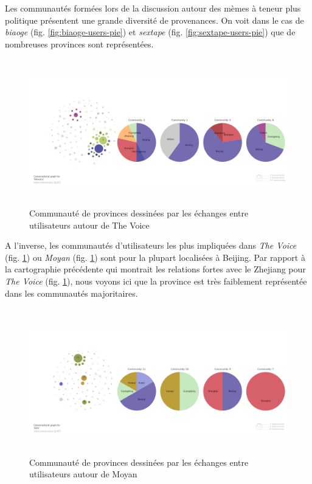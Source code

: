 Les communaut\'es form\'ees lors de la discussion autour des m\`emes \`a
teneur plus politique pr\'esentent une grande diversit\'e de
provenances. On voit dans le cas de \textit{biaoge} (fig. \ref{fig:biaoge-users-pie}) et \textit{sextape} (fig. \ref{fig:sextape-users-pie}) que de nombreuses provinces sont repr\'esent\'ees. 


\begin{figure}[H]
    \centering
    \includegraphics[width=5.9996in,height=2.5004in]{figures/chap4/chapitre4-img56.png}
    \caption{
        Communaut\'e de provinces dessin\'ees par les \'echanges entre utilisateurs autour de The Voice
    }
    \label{fig:voice-users-pie}
\end{figure}




A l{\textquoteright}inverse, les communaut\'es
d{\textquoteright}utilisateurs les plus impliqu\'ees dans \textit{The
Voice } (fig. \ref{fig:voice-users-pie}) ou \textit{Moyan} (fig. \ref{fig:voice-users-pie}) sont pour la plupart localis\'ees \`a Beijing.
Par rapport \`a la cartographie pr\'ec\'edente qui montrait les
relations fortes avec le Zhejiang pour \textit{The Voice} (fig. \ref{fig:voice-users-pie}), nous voyons
ici que la province est tr\`es faiblement repr\'esent\'ee dans les
communaut\'es majoritaires.


\begin{figure}[H]
  \centering
   \includegraphics[width=5.9996in,height=2.5004in]{figures/chap4/chapitre4-img57.png}
    \caption{
        Communaut\'e de provinces dessin\'ees par les \'echanges entre utilisateurs autour de Moyan
    }
    \label{fig:moyan-users-pie}
\end{figure}


